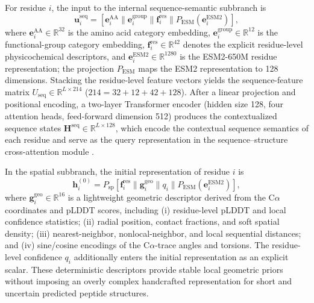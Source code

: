 \documentclass[12pt]{article}
\begin{document}
For residue $i$, the input to the internal sequence-semantic subbranch is
\begin{equation}
    \mathbf u_i^{\mathrm{seq}} = \left[\mathbf e_i^{\mathrm{AA}} \parallel
    \mathbf e_i^{\mathrm{group}} \parallel \mathbf f_i^{\mathrm{res}} \parallel
    P_{\mathrm{ESM}}\left(\mathbf e_i^{\mathrm{ESM2}}\right)\right],
    \label{eq:seq_feat}
\end{equation}
where $\mathbf e_i^{\mathrm{AA}} \in \mathbb{R}^{32}$ is the amino acid
category embedding, $\mathbf e_i^{\mathrm{group}} \in \mathbb{R}^{12}$ is the
functional-group category embedding, $\mathbf f_i^{\mathrm{res}} \in
\mathbb{R}^{42}$ denotes the explicit residue-level physicochemical
descriptors, and $\mathbf e_i^{\mathrm{ESM2}} \in \mathbb{R}^{1280}$ is the
ESM2-650M residue representation; the projection $P_{\mathrm{ESM}}$ maps the
ESM2 representation to 128 dimensions. Stacking the residue-level feature
vectors yields the sequence-feature matrix $U_{\mathrm{seq}} \in
\mathbb{R}^{L \times 214}$ ($214 = 32 + 12 + 42 + 128$). After a linear
projection and positional encoding, a two-layer Transformer encoder (hidden
size 128, four attention heads, feed-forward dimension 512) produces the
contextualized sequence states $\mathbf H^{\mathrm{seq}} \in
\mathbb{R}^{L \times 128}$, which encode the contextual sequence semantics of
each residue and serve as the query representation in the
sequence--structure cross-attention module \cite{vaswani2017transformer}.

In the spatial subbranch, the initial representation of residue $i$ is
\begin{equation}
    \mathbf h_i^{(0)} = P_{\mathrm{sp}}\left[\mathbf f_i^{\mathrm{res}}
    \parallel \mathbf g_i^{\mathrm{geo}} \parallel q_i \parallel
    P_{\mathrm{ESM}}\left(\mathbf e_i^{\mathrm{ESM2}}\right)\right],
    \label{eq:residue_init}
\end{equation}
where $\mathbf g_i^{\mathrm{geo}} \in \mathbb{R}^{16}$ is a lightweight
geometric descriptor derived from the C$\alpha$ coordinates and pLDDT scores,
including (i) residue-level pLDDT and local confidence statistics;
(ii) radial position, contact fractions, and soft spatial density;
(iii) nearest-neighbor, nonlocal-neighbor, and local sequential distances;
and (iv) sine/cosine encodings of the C$\alpha$-trace angles and torsions.
The residue-level confidence $q_i$ additionally enters the initial
representation as an explicit scalar. These deterministic descriptors
provide stable local geometric priors without imposing an overly complex
handcrafted representation for short and uncertain predicted peptide
structures.
\end{document}
